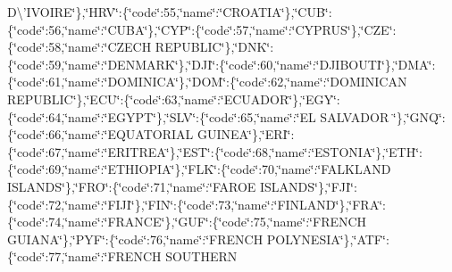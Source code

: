 \begin{DoxyCompactItemize}
D\textbackslash{}'I\-V\-O\-I\-R\-E\char`\"{}\},\char`\"{}H\-R\-V\char`\"{}\-:\{\char`\"{}code\char`\"{}\-:55,\char`\"{}name\char`\"{}\-:\char`\"{}C\-R\-O\-A\-T\-I\-A\char`\"{}\},\char`\"{}C\-U\-B\char`\"{}\-:\{\char`\"{}code\char`\"{}\-:56,\char`\"{}name\char`\"{}\-:\char`\"{}C\-U\-B\-A\char`\"{}\},\char`\"{}C\-Y\-P\char`\"{}\-:\{\char`\"{}code\char`\"{}\-:57,\char`\"{}name\char`\"{}\-:\char`\"{}C\-Y\-P\-R\-U\-S\char`\"{}\},\char`\"{}C\-Z\-E\char`\"{}\-:\{\char`\"{}code\char`\"{}\-:58,\char`\"{}name\char`\"{}\-:\char`\"{}C\-Z\-E\-C\-H R\-E\-P\-U\-B\-L\-I\-C\char`\"{}\},\char`\"{}D\-N\-K\char`\"{}\-:\{\char`\"{}code\char`\"{}\-:59,\char`\"{}name\char`\"{}\-:\char`\"{}D\-E\-N\-M\-A\-R\-K\char`\"{}\},\char`\"{}D\-J\-I\char`\"{}\-:\{\char`\"{}code\char`\"{}\-:60,\char`\"{}name\char`\"{}\-:\char`\"{}D\-J\-I\-B\-O\-U\-T\-I\char`\"{}\},\char`\"{}D\-M\-A\char`\"{}\-:\{\char`\"{}code\char`\"{}\-:61,\char`\"{}name\char`\"{}\-:\char`\"{}D\-O\-M\-I\-N\-I\-C\-A\char`\"{}\},\char`\"{}D\-O\-M\char`\"{}\-:\{\char`\"{}code\char`\"{}\-:62,\char`\"{}name\char`\"{}\-:\char`\"{}D\-O\-M\-I\-N\-I\-C\-A\-N R\-E\-P\-U\-B\-L\-I\-C\char`\"{}\},\char`\"{}E\-C\-U\char`\"{}\-:\{\char`\"{}code\char`\"{}\-:63,\char`\"{}name\char`\"{}\-:\char`\"{}E\-C\-U\-A\-D\-O\-R\char`\"{}\},\char`\"{}E\-G\-Y\char`\"{}\-:\{\char`\"{}code\char`\"{}\-:64,\char`\"{}name\char`\"{}\-:\char`\"{}E\-G\-Y\-P\-T\char`\"{}\},\char`\"{}S\-L\-V\char`\"{}\-:\{\char`\"{}code\char`\"{}\-:65,\char`\"{}name\char`\"{}\-:\char`\"{}E\-L S\-A\-L\-V\-A\-D\-O\-R \char`\"{}\},\char`\"{}G\-N\-Q\char`\"{}\-:\{\char`\"{}code\char`\"{}\-:66,\char`\"{}name\char`\"{}\-:\char`\"{}E\-Q\-U\-A\-T\-O\-R\-I\-A\-L G\-U\-I\-N\-E\-A\char`\"{}\},\char`\"{}E\-R\-I\char`\"{}\-:\{\char`\"{}code\char`\"{}\-:67,\char`\"{}name\char`\"{}\-:\char`\"{}E\-R\-I\-T\-R\-E\-A\char`\"{}\},\char`\"{}E\-S\-T\char`\"{}\-:\{\char`\"{}code\char`\"{}\-:68,\char`\"{}name\char`\"{}\-:\char`\"{}E\-S\-T\-O\-N\-I\-A\char`\"{}\},\char`\"{}E\-T\-H\char`\"{}\-:\{\char`\"{}code\char`\"{}\-:69,\char`\"{}name\char`\"{}\-:\char`\"{}E\-T\-H\-I\-O\-P\-I\-A\char`\"{}\},\char`\"{}F\-L\-K\char`\"{}\-:\{\char`\"{}code\char`\"{}\-:70,\char`\"{}name\char`\"{}\-:\char`\"{}F\-A\-L\-K\-L\-A\-N\-D I\-S\-L\-A\-N\-D\-S\char`\"{}\},\char`\"{}F\-R\-O\char`\"{}\-:\{\char`\"{}code\char`\"{}\-:71,\char`\"{}name\char`\"{}\-:\char`\"{}F\-A\-R\-O\-E I\-S\-L\-A\-N\-D\-S\char`\"{}\},\char`\"{}F\-J\-I\char`\"{}\-:\{\char`\"{}code\char`\"{}\-:72,\char`\"{}name\char`\"{}\-:\char`\"{}F\-I\-J\-I\char`\"{}\},\char`\"{}F\-I\-N\char`\"{}\-:\{\char`\"{}code\char`\"{}\-:73,\char`\"{}name\char`\"{}\-:\char`\"{}F\-I\-N\-L\-A\-N\-D\char`\"{}\},\char`\"{}F\-R\-A\char`\"{}\-:\{\char`\"{}code\char`\"{}\-:74,\char`\"{}name\char`\"{}\-:\char`\"{}F\-R\-A\-N\-C\-E\char`\"{}\},\char`\"{}G\-U\-F\char`\"{}\-:\{\char`\"{}code\char`\"{}\-:75,\char`\"{}name\char`\"{}\-:\char`\"{}F\-R\-E\-N\-C\-H G\-U\-I\-A\-N\-A\char`\"{}\},\char`\"{}P\-Y\-F\char`\"{}\-:\{\char`\"{}code\char`\"{}\-:76,\char`\"{}name\char`\"{}\-:\char`\"{}F\-R\-E\-N\-C\-H P\-O\-L\-Y\-N\-E\-S\-I\-A\char`\"{}\},\char`\"{}A\-T\-F\char`\"{}\-:\{\char`\"{}code\char`\"{}\-:77,\char`\"{}name\char`\"{}\-:\char`\"{}F\-R\-E\-N\-C\-H S\-O\-U\-T\-H\-E\-R\-N 
\end{DoxyCompactItemize}
